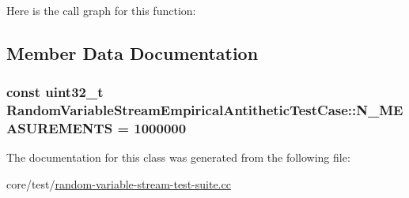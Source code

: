 Here is the call graph for this function\+:




\subsection{Member Data Documentation}
\subsubsection[{\texorpdfstring{N\+\_\+\+M\+E\+A\+S\+U\+R\+E\+M\+E\+N\+TS}{N_MEASUREMENTS}}]{\setlength{\rightskip}{0pt plus 5cm}const uint32\+\_\+t Random\+Variable\+Stream\+Empirical\+Antithetic\+Test\+Case\+::\+N\+\_\+\+M\+E\+A\+S\+U\+R\+E\+M\+E\+N\+TS = 1000000\hspace{0.3cm}{\ttfamily [static]}}\hypertarget{classRandomVariableStreamEmpiricalAntitheticTestCase_ad11d56c364b966694fdf0c339dfa4f72}{}\label{classRandomVariableStreamEmpiricalAntitheticTestCase_ad11d56c364b966694fdf0c339dfa4f72}


The documentation for this class was generated from the following file\+:\begin{DoxyCompactItemize}
\item 
core/test/\hyperlink{random-variable-stream-test-suite_8cc}{random-\/variable-\/stream-\/test-\/suite.\+cc}\end{DoxyCompactItemize}
